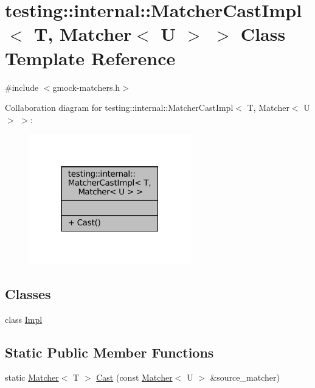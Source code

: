 \hypertarget{classtesting_1_1internal_1_1MatcherCastImpl_3_01T_00_01Matcher_3_01U_01_4_01_4}{}\section{testing\+:\+:internal\+:\+:Matcher\+Cast\+Impl$<$ T, Matcher$<$ U $>$ $>$ Class Template Reference}
\label{classtesting_1_1internal_1_1MatcherCastImpl_3_01T_00_01Matcher_3_01U_01_4_01_4}


{\ttfamily \#include $<$gmock-\/matchers.\+h$>$}



Collaboration diagram for testing\+:\+:internal\+:\+:Matcher\+Cast\+Impl$<$ T, Matcher$<$ U $>$ $>$\+:
\nopagebreak
\begin{figure}[H]
\begin{center}
\leavevmode
\includegraphics[width=199pt]{classtesting_1_1internal_1_1MatcherCastImpl_3_01T_00_01Matcher_3_01U_01_4_01_4__coll__graph}
\end{center}
\end{figure}
\subsection*{Classes}
\begin{DoxyCompactItemize}
\item 
class \hyperlink{classtesting_1_1internal_1_1MatcherCastImpl_3_01T_00_01Matcher_3_01U_01_4_01_4_1_1Impl}{Impl}
\end{DoxyCompactItemize}
\subsection*{Static Public Member Functions}
\begin{DoxyCompactItemize}
\item 
static \hyperlink{classtesting_1_1Matcher}{Matcher}$<$ T $>$ \hyperlink{classtesting_1_1internal_1_1MatcherCastImpl_3_01T_00_01Matcher_3_01U_01_4_01_4_a913a41264cc05c1fd261ee0cf1ede6fe}{Cast} (const \hyperlink{classtesting_1_1Matcher}{Matcher}$<$ U $>$ \&source\+\_\+matcher)
\end{DoxyCompactItemize}


